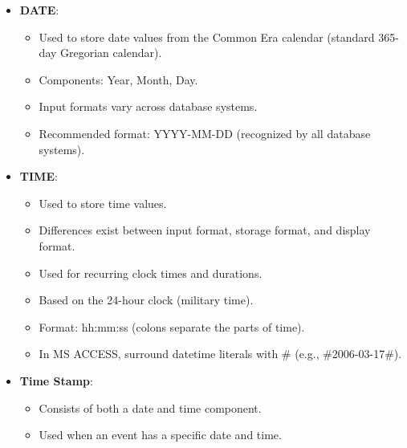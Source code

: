 \documentclass{article}
\begin{document}
\begin{itemize}
    \item \textbf{DATE}:
    \begin{itemize}
        \item Used to store date values from the Common Era calendar (standard 365-day Gregorian calendar).
        \item Components: Year, Month, Day.
        \item Input formats vary across database systems.
        \item Recommended format: YYYY-MM-DD (recognized by all database systems).
    \end{itemize}
    \item \textbf{TIME}:
    \begin{itemize}
        \item Used to store time values.
        \item Differences exist between input format, storage format, and display format.
        \item Used for recurring clock times and durations.
        \item Based on the 24-hour clock (military time).
        \item Format: hh:mm:ss (colons separate the parts of time).
        \item In MS ACCESS, surround datetime literals with \# (e.g., \#2006-03-17\#).
    \end{itemize}
    \item \textbf{Time Stamp}:
    \begin{itemize}
        \item Consists of both a date and time component.
        \item Used when an event has a specific date and time.
    \end{itemize}
\end{itemize}
\end{document}
